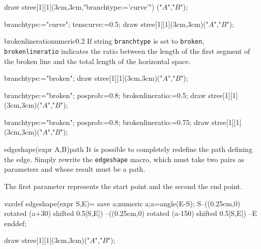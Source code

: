 \documentclass[11pt,a4paper,english]{article}
\begin{document}
\begin{exemple}[lefthand ratio=0.6]
 draw stree[1][1](3cm,3cm,"branchtype:='curve'")
                                         ("$A$","$B$");
\end{exemple}



\begin{exemple}[lefthand ratio=0.6]
 branchtype:="curve";
 tenscurve:=0.5;
 draw stree[1][1](3cm,3cm)("$A$","$B$");
\end{exemple}


\begin{mptparam}{brokenlineratio}{numeric}{0.2}
 If string \verb|branchtype| is set to \verb|broken|, \verb|brokenlineratio| indicates the ratio between the length of the first segment of the broken line and the total length of the horizontal space.
 \end{mptparam}

\begin{exemple}[lefthand ratio=0.6]
 branchtype:="broken";
 draw stree[1][1](3cm,3cm)("$A$","$B$");
\end{exemple}

\begin{exemple}[lefthand ratio=0.6]
 branchtype:="broken";
 posprob:=0.8;
 brokenlineratio:=0.5;
 draw stree[1][1](3cm,3cm)("$A$","$B$");
\end{exemple}


\begin{exemple}[lefthand ratio=0.6]
 branchtype:="broken";
 posprob:=0.8;
 brokenlineratio:=0.75;
 draw stree[1][1](3cm,3cm)("$A$","$B$");
\end{exemple}

\begin{rpobjet}{edgeshape(expr A,B)}{path}
It is possible to completely redefine the path defining the edge. Simply rewrite the \verb|edgeshape| macro, which must take two pairs as parameters and whose result must be a path.

The first parameter represents the start point and the second the end point.

\end{rpobjet}

\begin{exemple}[lefthand ratio=0.6]
vardef edgeshape(expr S,E)=
 save a;numeric a;a=angle(E-S);
 S--((0.25cm,0) rotated (a+30) shifted 0.5[S,E])
  --((0.25cm,0) rotated (a-150) shifted 0.5[S,E])
  --E
enddef;

draw stree[1][1](3cm,3cm)("$A$","$B$");
\end{exemple}
\end{document}
